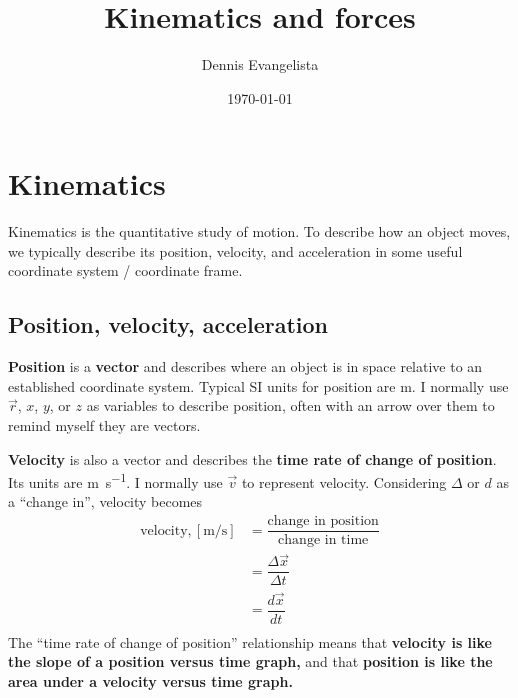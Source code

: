 \documentclass{tufte-handout}
\title{Kinematics and forces}
\author{Dennis Evangelista}
\date{\today}
\begin{document}
\maketitle

\hypertarget{kinematics}{%
\section{Kinematics}\label{kinematics}}

Kinematics is the quantitative study of motion. To describe how an
object moves, we typically describe its position, velocity, and
acceleration in some useful coordinate system / coordinate frame.

\hypertarget{position-velocity-acceleration}{%
\subsection{Position, velocity,
acceleration}\label{position-velocity-acceleration}}

\textbf{Position} is a
\textbf{vector} and describes where an object is in space relative to an established
coordinate system. Typical SI units for position are \unit{\meter}. I
normally use \(\vec{r}\), \(x\), \(y\), or \(z\) as variables to
describe position, often with an arrow over them to remind myself they
are vectors.

\textbf{Velocity} is also a vector and describes the \textbf{time rate
of change of position}. Its units are \unit{\meter\per\second}. I
normally use \(\vec{v}\) to represent velocity. Considering \(\Delta\)
or \(d\) as a ``change in'', velocity becomes \begin{align}
\text{velocity}, [\si{\meter\per\second}] &= \dfrac{\text{change in position}}{\text{change in time}} \\
&= \dfrac{\Delta \vec{x}}{\Delta t} \\
&= \dfrac{d\vec{x}}{dt} \\
\end{align}
 The ``time rate of change of position'' relationship means that
\textbf{velocity is like the slope of a position versus time graph,} and
that \textbf{position is like the area under a velocity versus time
graph.}
\end{document}
